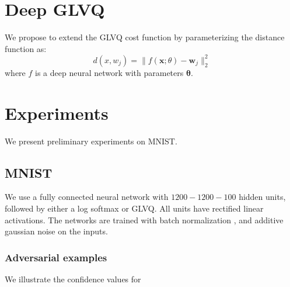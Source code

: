 \documentclass{esannV2}
\begin{document}

\section{Deep GLVQ}
We propose to extend the GLVQ cost function by parameterizing the distance function as:
\begin{equation}
 d(x, w_j) = \|f(\mathbf{x}; \theta) - \mathbf{w}_j\|^2_2
\end{equation}
where $f$ is a deep neural network with parameters $\mathbf{\theta}$. 


\section{Experiments}
We present preliminary experiments on MNIST. 

\subsection{MNIST}
We use a fully connected neural network with $1200-1200-100$ hidden units, followed by either a log softmax or GLVQ. All units have rectified linear activations. The networks are trained with batch normalization \cite{DBLP:journals/corr/IoffeS15}, and additive gaussian noise on the inputs. 


\subsubsection{Adversarial examples}
We illustrate the confidence values for 
\end{document}
